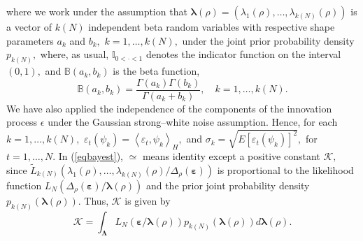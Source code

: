 \documentclass[11pt,a4paper]{article}
\begin{document}
 \noindent where we  work under the assumption that $\boldsymbol{\lambda}(\rho)=(\lambda_{1}(\rho ),\dots,\lambda_{k(N)}(\rho ))$  is a vector of  $k(N)$
 independent   beta  random variables with  respective shape
    parameters $a_{k}$ and  $ b_{k},$   $k=1,\dots,k(N),$ under the joint prior probability density  $p_{k(N)},$ where,  as usual, $\mathbb{I}_{0<\cdot<1}$
    denotes the indicator  function on the interval $(0,1),$ and   $\mathbb{B}(a_{k}, b_{k})$ is the beta
    function,
    $$ \mathbb{B}(a_{k}, b_{k})=\frac{\Gamma(a_{k})\Gamma(b_{k})}{\Gamma(a_{k}+b_{k})},\quad k=1,\dots, k(N).$$
\noindent     We have also applied the independence of the components of the innovation process  $\epsilon$  under
the Gaussian  strong--white noise assumption. Hence, for  each $k=1,\dots, k(N),$
   $\varepsilon_{t}(\psi_{k})=\left\langle \varepsilon_{t},\psi_{k}\right\rangle_{H},$ and
    $\sigma_{k} = \sqrt{E[\varepsilon_t(\psi_{k})]^2},$  for $t=1,\dots,N.$
In  (\ref{eqbayest}), $\simeq $  means identity except a positive constant  $\mathcal{K},$ since $\widetilde{L}_{k(N)}\left(\lambda_{1}(\rho ),\dots,\lambda_{k(N)}(\rho )/\Delta_{\rho}(\boldsymbol{\varepsilon})\right)$ is  proportional to
the  likelihood
function  $L_{N}(\Delta_{\rho}(\boldsymbol{\varepsilon})/\boldsymbol{\lambda}(\rho))$ and  the prior joint  probability density $p_{k(N)}\left(\boldsymbol{\lambda}(\rho)\right).$
 Thus, $\mathcal{K}$ is given by
 $$\mathcal{K}=\int_{\boldsymbol{\Lambda }} L_{N}(\boldsymbol{\varepsilon}/\boldsymbol{\lambda}(\rho))p_{k(N)}\left(\boldsymbol{\lambda}(\rho)\right)
 d\boldsymbol{\lambda}(\rho).$$
\end{document}
